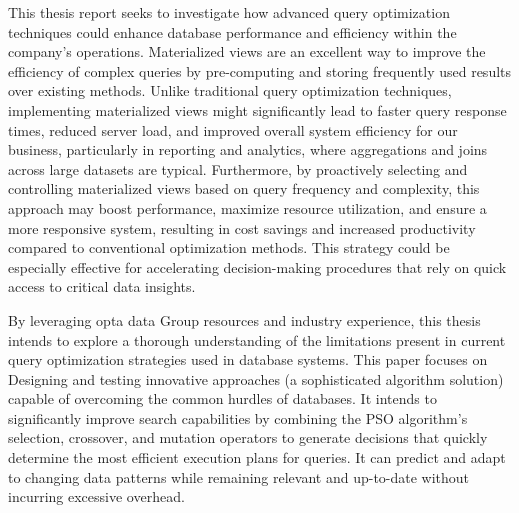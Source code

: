 This thesis report seeks to investigate how advanced query optimization techniques could enhance database performance and efficiency within the company's operations. Materialized views are an excellent way to improve the efficiency of complex queries by pre-computing and storing frequently used results over existing methods. Unlike traditional query optimization techniques, implementing materialized views might significantly lead to faster query response times, reduced server load, and improved overall system efficiency for our business, particularly in reporting and analytics, where aggregations and joins across large datasets are typical. Furthermore, by proactively selecting and controlling materialized views based on query frequency and complexity, this approach may boost performance, maximize resource utilization, and ensure a more responsive system, resulting in cost savings and increased productivity compared to conventional optimization methods. This strategy could be especially effective for accelerating decision-making procedures that rely on quick access to critical data insights.\vspace{.4cm}

By leveraging opta data Group resources and industry experience, this thesis intends to explore a thorough understanding of the limitations present in current query optimization strategies used in database systems. This paper focuses on Designing and testing innovative approaches (a sophisticated algorithm solution) capable of overcoming the common hurdles of databases. It intends to significantly improve search capabilities by combining the PSO algorithm's selection, crossover, and mutation operators to generate decisions that quickly determine the most efficient execution plans for queries. It can predict and adapt to changing data patterns while remaining relevant and up-to-date without incurring excessive overhead.\vspace{.4cm}



